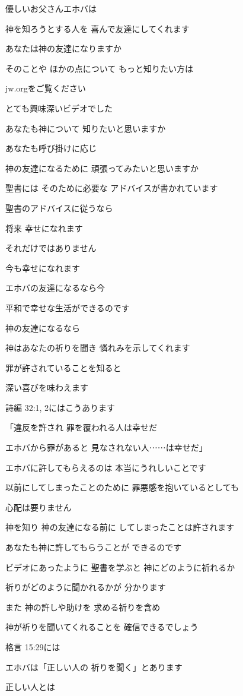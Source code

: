 \documentclass[twocolumn]{jsarticle}
\begin{document}
優しいお父さんエホバは

神を知ろうとする人を
喜んで友達にしてくれます

あなたは神の友達になりますか

そのことや ほかの点について
もっと知りたい方は

jw.orgをご覧ください

とても興味深いビデオでした

あなたも神について
知りたいと思いますか

あなたも呼び掛けに応じ

神の友達になるために
頑張ってみたいと思いますか

聖書には そのために必要な
アドバイスが書かれています

聖書のアドバイスに従うなら

将来 幸せになれます

それだけではありません

今も幸せになれます

エホバの友達になるなら今

平和で幸せな生活ができるのです

神の友達になるなら

神はあなたの祈りを聞き
憐れみを示してくれます

罪が許されていることを知ると

深い喜びを味わえます

詩編 32:1, 2にはこうあります

「違反を許され
罪を覆われる人は幸せだ

エホバから罪があると
見なされない人⋯⋯は幸せだ」

エホバに許してもらえるのは
本当にうれしいことです

以前にしてしまったことのために
罪悪感を抱いているとしても

心配は要りません

神を知り 神の友達になる前に
してしまったことは許されます

あなたも神に許してもらうことが
できるのです

ビデオにあったように 聖書を学ぶと
神にどのように祈れるか

祈りがどのように聞かれるかが
分かります

また 神の許しや助けを
求める祈りを含め

神が祈りを聞いてくれることを
確信できるでしょう

格言 15:29には

エホバは「正しい人の
祈りを聞く」とあります

正しい人とは
\end{document}
